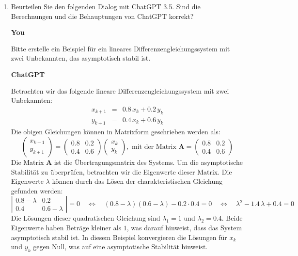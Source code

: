 \begin{Aufgabe}[10]
\begin{enumerate}
		\newpage
		
	\item
		Beurteilen Sie den folgenden Dialog mit ChatGPT 3.5.
		Sind die Berechnungen und die Behauptungen von ChatGPT korrekt?
		 
		 \vspace*{2ex}
		 
		 \textbf{You}
		 
		Bitte erstelle ein Beispiel für ein lineares Differenzengleichungssystem mit zwei Unbekannten, das asymptotisch stabil ist.
		
		\vspace*{2ex}
		
		\textbf{ChatGPT}
		
		Betrachten wir das folgende lineare Differenzengleichungssystem mit zwei Unbekannten:
		\[
			\begin{array}{lcl}
				x_{k+1} & = & 0.8 \, x_k + 0.2 \, y_k \\
				y_{k+1} & = & 0.4 \, x_k + 0.6 \, y_k
			\end{array}
		\]
		Die obigen Gleichungen können in Matrixform geschrieben werden als:
		\[
			\left(
				\begin{array}{c}
					x_{k+1} \\
					y_{k+1}
				\end{array}
			\right)
			= 
			\left(
			\begin{array}{cc}
				0.8 & 0.2 \\
				0.4 & 0.6
			\end{array}
			\right)
			\left(
			\begin{array}{c}
				x_{k} \\
				y_{k}
			\end{array}
			\right), \mbox{ mit der Matrix }
			\mathbf{A} =
			\left(
			\begin{array}{cc}
				0.8 & 0.2 \\
				0.4 & 0.6
			\end{array}
			\right)
		\]
		Die Matrix $\mathbf{A}$ ist die Übertragungsmatrix des Systems.
		Um die asymptotische Stabilität zu überprüfen, betrachten wir die Eigenwerte dieser Matrix.
		Die Eigenwerte $\lambda$ können durch das Lösen der charakteristischen Gleichung gefunden werden:
		\[
			\left|
				\begin{array}{cc}
					0.8 - \lambda & 0.2 \\ 
					0.4 & 0.6 - \lambda
				\end{array}
			\right| = 0
			\quad \Longleftrightarrow \quad
			(0.8 - \lambda)(0.6 - \lambda) -0.2 \cdot 0.4 = 0
			\quad \Longleftrightarrow \quad
			\lambda^2 - 1.4 \, \lambda + 0.4 = 0
		\]
		Die Lösungen dieser quadratischen Gleichung sind $\lambda_1=1$ und $\lambda_2=0.4$.
		Beide Eigenwerte haben Beträge kleiner als $1$, was darauf hinweist, dass  das System asymptotisch stabil ist.
		In diesem Beispiel konvergieren die Lösungen für $x_k$ und $y_k$ gegen Null, was auf eine asymptotische Stabilität hinweist.  
		

\end{enumerate}
\end{Aufgabe}
